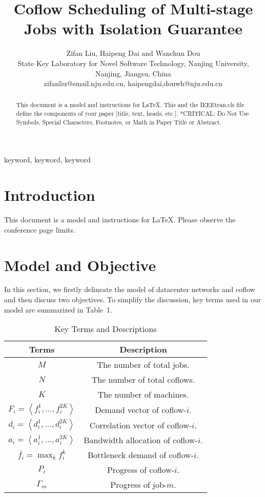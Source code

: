 \documentclass[10pt, conference, letterpaper]{IEEEtran}
\begin{document}
\title{Coflow Scheduling of Multi-stage Jobs with Isolation Guarantee}

\author{Zifan Liu, Haipeng Dai and Wanchun Dou\\
State Key Laboratory for Novel Software Technology, Nanjing University, Nanjing, Jiangsu, China\\
zifanliu@smail.nju.edu.cn, haipengdai,douwh@nju.edu.cn}

\maketitle

\begin{abstract}
This document is a model and instructions for \LaTeX.
This and the IEEEtran.cls file define the components of your paper [title, text, heads, etc.]. *CRITICAL: Do Not Use Symbols, Special Characters, Footnotes,
or Math in Paper Title or Abstract.
\end{abstract}

\begin{IEEEkeywords}
keyword, keyword, keyword
\end{IEEEkeywords}

\section{Introduction}
This document is a model and instructions for \LaTeX.
Please observe the conference page limits.

\section{Model and Objective}
In this section, we firstly delineate the model of datacenter networks and coflow and then discuss two objectives. To simplify the discussion, key terms used in our model are summarized in Table~1.
\begin{table}
\caption{Key Terms and Descriptions}
\begin{center}
\begin{tabular}{|c|c|}
\hline
Terms & Description\\
\hline
$M$ & The number of total jobs.\\
\hline
$N$ & The number of total coflows.\\
\hline
$K$ & The number of machines.\\
\hline
$F_i = \left\langle f_i^1,\dots,f_i^{2K}\right\rangle$ & Demand vector of coflow-$i$.\\
\hline
$d_i = \left\langle d_i^1,\dots,d_i^{2K}\right\rangle$ & Correlation vector of coflow-$i$.\\
\hline
$a_i=\left\langle a_i^1,\dots,a_i^{2K}\right\rangle$ & Bandwidth allocation of coflow-$i$.\\
\hline
$\overline{f_i}=\max_{k} f_i^k$ & Bottleneck demand of coflow-$i$.\\
\hline
$P_i$ & Progress of coflow-$i$.\\
\hline
$\Gamma_m$ & Progress of job-$m$.\\
\hline
\end{tabular}
\end{center}
\end{table}
\end{document}
